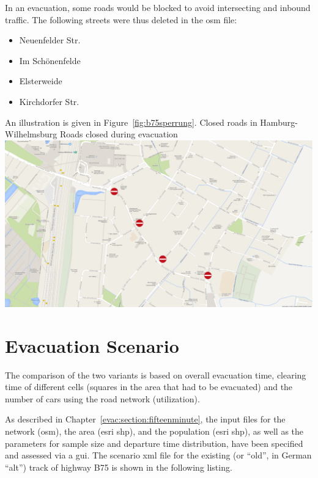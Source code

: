 In an evacuation, some roads would be blocked to avoid intersecting and inbound traffic. The following streets were thus deleted in the \gls{osm} file:
%
\begin{itemize}\styleItemize
	\item Neuenfelder Str. 
	\item Im Schönenfelde
	\item Elsterweide
	\item Kirchdorfer Str.
\end{itemize}
%
An illustration is given in Figure~\ref{fig:b75sperrung}.
%
%
\createfigure%
{Closed roads in Hamburg-Wilhelmsburg}%
{Roads closed during evacuation}%
{\label{fig:b75sperrung}}%
{\includegraphics[width=0.7\linewidth]{scenarios/figures/B75sperrung}}%
{}

\section{Evacuation Scenario}
The comparison of the two variants is based on overall evacuation time, clearing time of different cells (squares in the area that had to be evacuated) and the number of cars using the road network (utilization).

As described in Chapter~\ref{evac:section:fifteenminute}, the input files for the network (\gls{osm}), the area (\gls{esri} shp), and the population (\gls{esri} shp), as well as the parameters for sample size and departure time distribution, have been specified and assessed via a \gls{gui}. The scenario \gls{xml} file for the existing (or ``old'', in German ``alt'') track of highway B75 is shown in the following listing. 



